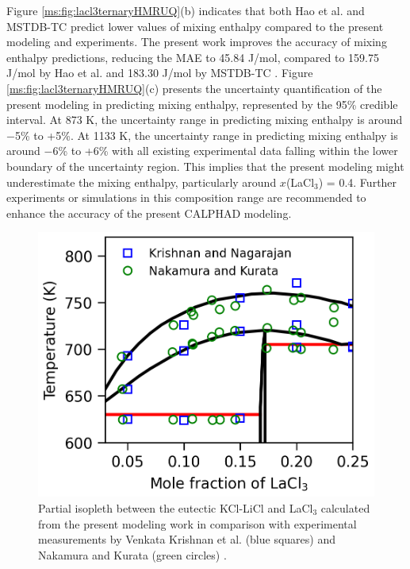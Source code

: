 Figure \ref{ms:fig:lacl3ternaryHMRUQ}(b) indicates that both Hao et al. \cite{hao2024thermodynamic} and MSTDB-TC \cite{ard2022development} predict lower values of mixing enthalpy compared to the present modeling and experiments. The present work improves the accuracy of mixing enthalpy predictions, reducing the MAE to 45.84 J/mol, compared to 159.75 J/mol by Hao et al. \cite{hao2024thermodynamic} and 183.30 J/mol by MSTDB-TC \cite{ard2022development}. Figure \ref{ms:fig:lacl3ternaryHMRUQ}(c) presents the uncertainty quantification of the present modeling in predicting mixing enthalpy, represented by the 95\% credible interval. At 873 K, the uncertainty range in predicting mixing enthalpy is around $-$5\% to +5\%. At 1133 K, the uncertainty range in predicting mixing enthalpy is around $-$6\% to +6\% with all existing experimental data falling within the lower boundary of the uncertainty region. This implies that the present modeling might underestimate the mixing enthalpy, particularly around $x$(LaCl$_3$) = 0.4. Further experiments or simulations in this composition range are recommended to enhance the accuracy of the present CALPHAD modeling.

\begin{figure} [H]
    \centering
    \includegraphics[width=0.6\linewidth]{moltensalts/Moltensalts-Isopleth-LaCl3-LiCl-KCl.png}
    \caption{Partial isopleth between the eutectic KCl-LiCl and LaCl$_3$ calculated from the present modeling work in comparison with experimental measurements by Venkata Krishnan et al. (blue squares) \cite{venkata2006pseudo} and Nakamura and Kurata (green circles) \cite{nakamura1997thermal}.}
    \label{ms:fig:lacl3ternaryisopleth}
\end{figure}

